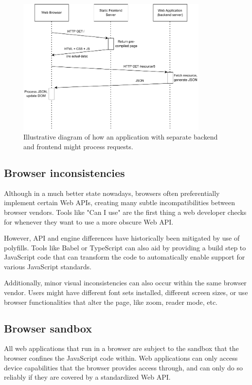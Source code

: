 \begin{figure}[htbp]
    \centering
    \includegraphics[width=0.85\textwidth]{./figures/ch2_spa-seq-diag.pdf}
    \caption{Illustrative diagram of how an application with separate backend and frontend might process requests.}
    \label{FigSPASeqDiag}
\end{figure}

\subsection{Browser inconsistencies}

Although in a much better state nowadays, browsers often preferentially implement certain Web APIs, creating many subtle incompatibilities between browser vendors. Tools like "Can I use" \cite{CanIUse} are the first thing a web developer checks for whenever they want to use a more obscure Web API.

However, API and engine differences have historically been mitigated by use of polyfills. Tools like Babel or TypeScript can also aid by providing a build step to JavaScript code that can transform the code to automatically enable support for various JavaScript standards.

Additionally, minor visual inconsistencies can also occur within the same brow\-ser vendor. Users might have different font sets installed, different screen sizes, or use browser functionalities that alter the page, like zoom, reader mode, etc.

\subsection{Browser sandbox}
All web applications that run in a browser are subject to the sandbox that the brow\-ser confines the JavaScript code within. Web applications can only access device capabilities that the browser provides access through, and can only do so reliably if they are covered by a standardized Web API.

